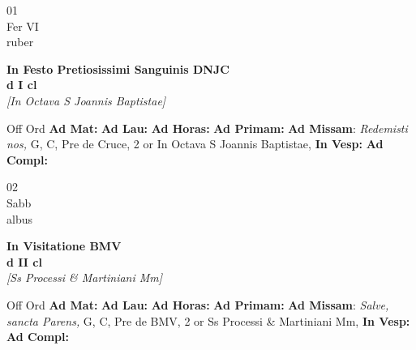 \documentclass[10pt, openany]{book}
\begin{document}
    \begin{center}
        \begin{minipage}{3.5in}
            \vspace{2em}
            \begin{minipage}{0.5in}
                {\Huge 01} \\
                {\normalsize Fer VI} \\
                {\normalsize ruber}
            \end{minipage}
            \begin{minipage}{3.0in}
                \textbf{ \large In Festo Pretiosissimi Sanguinis DNJC \\
                \textnormal{\normalsize d I cl}} \\ \textit{[In Octava S Joannis Baptistae]} \\ 
            \end{minipage}
            \begin{justify}Off Ord
                \textbf{Ad Mat: }
                \textbf{Ad Lau: }
                \textbf{Ad Horas: }
                \textbf{Ad Primam: }\textbf{Ad Missam}: \textit{Redemisti nos,} G, C, Pre de Cruce, 2 or In Octava S Joannis Baptistae,  
                \textbf{In Vesp: }
                \textbf{Ad Compl: }
            \end{justify}
        \end{minipage}
    \end{center}

    \begin{center}
        \begin{minipage}{3.5in}
            \vspace{2em}
            \begin{minipage}{0.5in}
                {\Huge 02} \\
                {\normalsize Sabb} \\
                {\normalsize albus}
            \end{minipage}
            \begin{minipage}{3.0in}
                \textbf{ \large In Visitatione BMV \\
                \textnormal{\normalsize d II cl}} \\ \textit{[Ss Processi \& Martiniani Mm]} \\ 
            \end{minipage}
            \begin{justify}Off Ord
                \textbf{Ad Mat: }
                \textbf{Ad Lau: }
                \textbf{Ad Horas: }
                \textbf{Ad Primam: }\textbf{Ad Missam}: \textit{Salve, sancta Parens,} G, C, Pre de BMV, 2 or Ss Processi \& Martiniani Mm,  
                \textbf{In Vesp: }
                \textbf{Ad Compl: }
            \end{justify}
        \end{minipage}
    \end{center}
\end{document}
